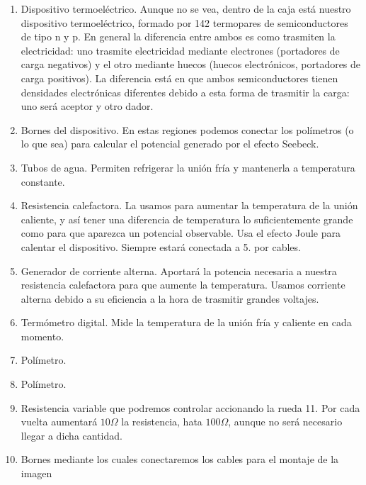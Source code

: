 \documentclass[12pt,a4paper]{article}
\begin{document}
\begin{enumerate}
\item Dispositivo termoeléctrico. Aunque no se vea, dentro de la caja está nuestro dispositivo termoeléctrico, formado por 142 termopares de semiconductores de tipo n y p. En general la diferencia entre ambos es como trasmiten la electricidad: uno trasmite electricidad mediante electrones (portadores de carga negativos) y el otro mediante huecos (huecos electrónicos, portadores de carga positivos). La diferencia está en que ambos semiconductores tienen densidades electrónicas diferentes debido a esta forma de trasmitir la carga: uno será aceptor y otro dador.

\item Bornes del dispositivo. En estas regiones podemos conectar los polímetros (o lo que sea) para calcular el potencial generado por el efecto Seebeck.

\item Tubos de agua. Permiten refrigerar la unión fría y mantenerla a temperatura constante.

\item Resistencia calefactora. La usamos para aumentar la temperatura de la unión caliente, y así tener una diferencia de temperatura lo suficientemente grande como para que aparezca un potencial observable. Usa el efecto Joule para calentar el dispositivo. Siempre estará conectada a 5. por cables.
 
\item  Generador de corriente alterna. Aportará la potencia necesaria a nuestra resistencia calefactora para que aumente la temperatura. Usamos corriente alterna debido a su eficiencia a la hora de trasmitir grandes voltajes.

\item Termómetro digital. Mide la temperatura de la unión fría y caliente en cada momento. 

\item Polímetro. 

\item Polímetro.

\item Resistencia variable que podremos controlar accionando la rueda 11. Por cada vuelta aumentará $10 \Omega$ la resistencia, hata $100 \Omega$, aunque no será necesario llegar a dicha cantidad. 

\item Bornes mediante los cuales conectaremos los cables para el montaje de la imagen 

\end{enumerate}
 
\end{document}
